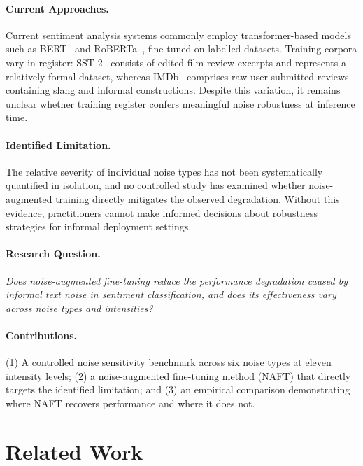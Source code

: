 \documentclass[sigconf]{acmart}
\begin{document}
\paragraph{Current Approaches.}
Current sentiment analysis systems commonly employ transformer-based
models such as BERT~\cite{devlin2019bert} and
RoBERTa~\cite{liu2019roberta}, fine-tuned on labelled datasets.
Training corpora vary in register: SST-2~\cite{socher2013recursive}
consists of edited film review excerpts and represents a relatively
formal dataset, whereas IMDb~\cite{maas2011learning} comprises
raw user-submitted reviews containing slang and informal constructions.
Despite this variation, it remains unclear whether training register
confers meaningful noise robustness at inference time.

\paragraph{Identified Limitation.}
The relative severity of individual noise types has not been
systematically quantified in isolation, and no controlled study
has examined whether noise-augmented training directly mitigates
the observed degradation.
Without this evidence, practitioners cannot make informed decisions
about robustness strategies for informal deployment settings.

\paragraph{Research Question.}
\emph{Does noise-augmented fine-tuning reduce the performance
degradation caused by informal text noise in sentiment
classification, and does its effectiveness vary across noise types
and intensities?}

\paragraph{Contributions.}
(1) A controlled noise sensitivity benchmark across six noise types
at eleven intensity levels; (2) a noise-augmented fine-tuning method
(NAFT) that directly targets the identified limitation; and (3) an
empirical comparison demonstrating where NAFT recovers performance
and where it does not.

\section{Related Work}
\end{document}
